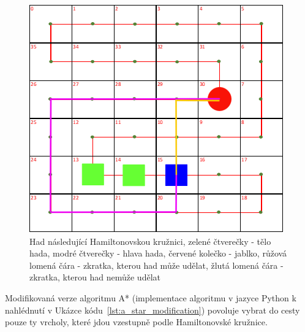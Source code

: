 \begin{figure}[h]
    \centering
    \includegraphics[width=0.8\linewidth]{Images/HadZkratkyPrikladyReseni.png}
    \caption{Had následující Hamiltonovskou kružnici, zelené čtverečky - tělo hada, modré čtverečky - hlava hada, červené kolečko - jablko, růžová lomená čára - zkratka, kterou had může udělat, žlutá lomená čára - zkratka, kterou had nemůže udělat}
    \label{fig:HadZkratkyPrikladyReseni}
\end{figure}

Modifikovaná verze algoritmu A* (implementace algoritmu v jazyce Python k nahlédnutí v Ukázce kódu~\ref{lst:a_star_modification}) povoluje vybrat do cesty pouze ty vrcholy, které jdou vzestupně podle Hamiltonovské kružnice.

